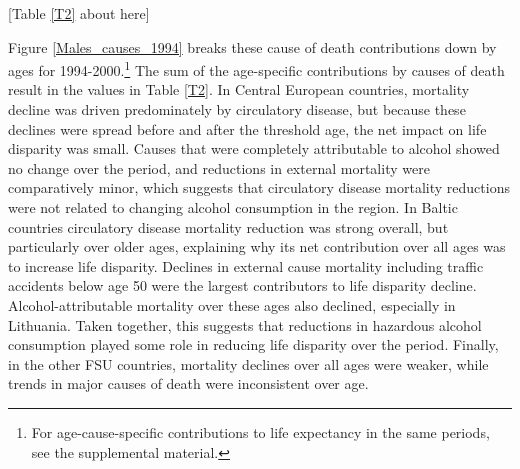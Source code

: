 \documentclass{article}
\begin{document}
\begin{spacing}{1.5}
\begin{center}
[Table  \ref{T2} about here]\\
\end{center}


Figure \ref{Males_causes_1994} breaks these cause of death contributions down by ages for 1994-2000.\footnote{For age-cause-specific contributions to life expectancy in the same periods, see the supplemental material.} The sum of the age-specific contributions by causes of death result in the values in Table \ref{T2}. In Central European countries, mortality decline was driven predominately by circulatory disease, but because these declines were spread before and after the threshold age, the net impact on life disparity was small. Causes that were completely attributable to alcohol showed no change over the period, and reductions in external mortality were comparatively minor, which suggests that circulatory disease mortality reductions were not related to changing alcohol consumption in the region. In Baltic countries circulatory disease mortality reduction was strong overall, but particularly over older ages, explaining why its net contribution over all ages was to increase life disparity. Declines in external cause mortality including traffic accidents below age 50 were the largest contributors to life disparity decline. Alcohol-attributable mortality over these ages also declined, especially in Lithuania. Taken together, this suggests that reductions in hazardous alcohol consumption played some role in reducing life disparity over the period. Finally, in the other FSU countries, mortality declines over all ages were weaker, while trends in major causes of death were inconsistent over age. \\


\end{spacing}
\end{document}
